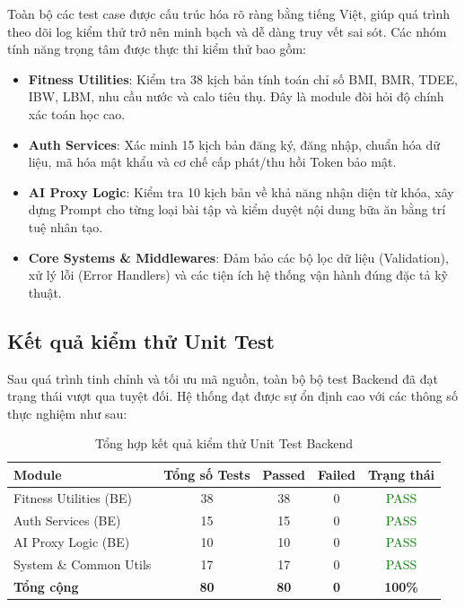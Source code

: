 Toàn bộ các test case được cấu trúc hóa rõ ràng bằng tiếng Việt, giúp quá trình theo dõi log kiểm thử trở nên minh bạch và dễ dàng truy vết sai sót. Các nhóm tính năng trọng tâm được thực thi kiểm thử bao gồm:
\begin{itemize}
    \item \textbf{Fitness Utilities}: Kiểm tra 38 kịch bản tính toán chỉ số BMI, BMR, TDEE, IBW, LBM, nhu cầu nước và calo tiêu thụ. Đây là module đòi hỏi độ chính xác toán học cao.
    \item \textbf{Auth Services}: Xác minh 15 kịch bản đăng ký, đăng nhập, chuẩn hóa dữ liệu, mã hóa mật khẩu và cơ chế cấp phát/thu hồi Token bảo mật.
    \item \textbf{AI Proxy Logic}: Kiểm tra 10 kịch bản về khả năng nhận diện từ khóa, xây dựng Prompt cho từng loại bài tập và kiểm duyệt nội dung bữa ăn bằng trí tuệ nhân tạo.
    \item \textbf{Core Systems \& Middlewares}: Đảm bảo các bộ lọc dữ liệu (Validation), xử lý lỗi (Error Handlers) và các tiện ích hệ thống vận hành đúng đặc tả kỹ thuật.
\end{itemize}

\subsection{Kết quả kiểm thử Unit Test}
Sau quá trình tinh chỉnh và tối ưu mã nguồn, toàn bộ bộ test Backend đã đạt trạng thái vượt qua tuyệt đối. Hệ thống đạt được sự ổn định cao với các thông số thực nghiệm như sau:

\begin{table}[H]
    \centering
    \caption{Tổng hợp kết quả kiểm thử Unit Test Backend}
    \label{tab:unit_test_final}
    \renewcommand{\arraystretch}{1.2}
    \begin{tabular}{|l|c|c|c|c|}
        \hline
        \textbf{Module} & \textbf{Tổng số Tests} & \textbf{Passed} & \textbf{Failed} & \textbf{Trạng thái} \\
        \hline
        Fitness Utilities (BE) & 38 & 38 & 0 & \textcolor{green}{PASS} \\
        \hline
        Auth Services (BE) & 15 & 15 & 0 & \textcolor{green}{PASS} \\
        \hline
        AI Proxy Logic (BE) & 10 & 10 & 0 & \textcolor{green}{PASS} \\
        \hline
        System \& Common Utils & 17 & 17 & 0 & \textcolor{green}{PASS} \\
        \hline
        \textbf{Tổng cộng} & \textbf{80} & \textbf{80} & \textbf{0} & \textbf{100\%} \\
        \hline
    \end{tabular}
\end{table}

